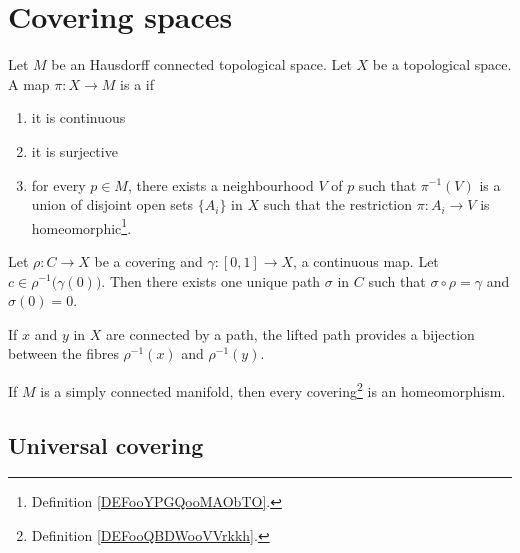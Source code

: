 \section{Covering spaces}

\begin{definition}      \label{DEFooQBDWooVVrkkh}
	Let \( M\) be an Hausdorff connected topological space. Let \( X\) be a topological space. A map \( \pi\colon X\to M\) is a  if
	\begin{enumerate}
		\item
		      it is continuous
		\item
		      it is surjective
		\item
		      for every \( p\in M\), there exists a neighbourhood \( V\) of \( p\) such that \( \pi^{-1}(V)\) is a union of disjoint open sets \( \{ A_i \}\) in \( X\) such that the restriction \( \pi\colon A_i\to V\) is homeomorphic\footnote{Definition \ref{DEFooYPGQooMAObTO}.}.
	\end{enumerate}
\end{definition}

\begin{proposition}
	Let \( \rho\colon C\to X\) be a covering and \( \gamma\colon [0,1]\to X\), a continuous map. Let \( c\in \rho^{-1}\big( \gamma(0) \big)\). Then there exists one unique path \( \sigma\) in \( C\) such that \( \sigma\circ\rho=\gamma\) and \( \sigma(0)=0\).
\end{proposition}
If \( x\) and \( y\) in \( X\) are connected by a path, the lifted path provides a bijection between the fibres \( \rho^{-1}(x)\) and \( \rho^{-1}(y)\).

\begin{proposition}     \label{PROPooPWIFooFAZhVe}
	If \( M\) is a simply connected manifold, then every covering\footnote{Definition \ref{DEFooQBDWooVVrkkh}.} is an homeomorphism.
\end{proposition}

\subsection{Universal covering}

